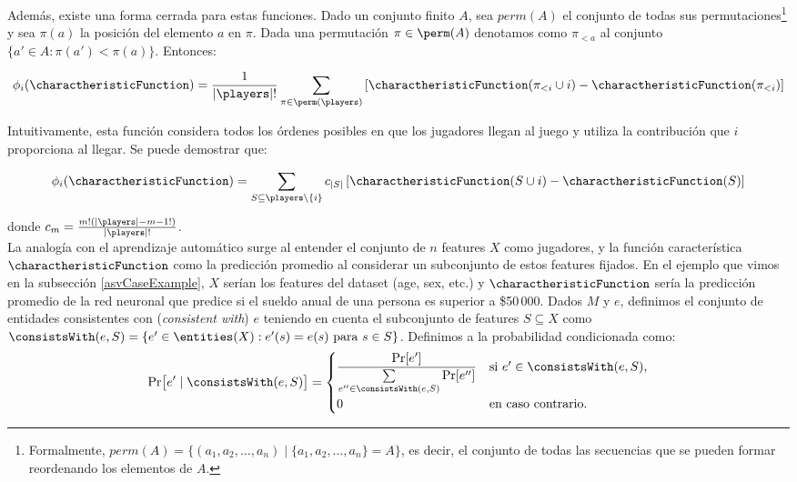 Además, existe una forma cerrada para estas funciones. Dado un conjunto finito $A$, sea $perm(A)$ el conjunto de todas sus permutaciones\footnote{Formalmente, $perm(A) = \{(a_1, a_2, \dots, a_n) \mid \{a_1, a_2, \dots, a_n\} = A\}$, es decir, el conjunto de todas las secuencias que se pueden formar reordenando los elementos de $A$.} y sea $\pi(a)$ la posición del elemento $a$ en $\pi$. Dada una permutación $\pi \in \perm(A)$ denotamos como $\pi_{<a}$ al conjunto $\{a' \in A : \pi(a') < \pi(a)\}$. Entonces:

\begin{align}\label{eq:shapley_values_by_perm}
	\phi_i(\charactheristicFunction) = \frac{1}{|\players|!} \sum_{\pi \in \perm(\players)} \left[\charactheristicFunction(\pi_{<i} \cup {i}) - \charactheristicFunction(\pi_{<i})\right]
\end{align}

Intuitivamente, esta función considera todos los órdenes posibles en que los jugadores llegan al juego y utiliza la contribución que $i$ proporciona al llegar. Se puede demostrar que:

\begin{align*}
	\phi_i(\charactheristicFunction) = \sum_{S \subseteq \players \setminus \{i\}} c_{|S|}\left[\charactheristicFunction(S \cup {i}) - \charactheristicFunction(S)\right]
\end{align*}

donde $c_m = \frac{m! (|\players|-m-1!)}{|\players|!}$.\\

La analogía con el aprendizaje automático surge al entender el conjunto de \(n\) features \(X\) como jugadores, y la función característica \(\charactheristicFunction\) como la predicción promedio al considerar un subconjunto de estos features fijados. En el ejemplo que vimos en la subsección \ref{asvCaseExample}, $X$ serían los features del dataset (age, sex, etc.) y $\charactheristicFunction$ sería la predicción promedio de la red neuronal que predice si el sueldo anual de una persona es superior a \$50\,000. Dados \(M\) y \(e\), definimos el conjunto de entidades consistentes con (\textit{consistent with}) \(e\) teniendo en cuenta el subconjunto de features \(S \subseteq X\) como \(\consistsWith(e, S) = \{e' \in \entities(X) : e'(s) = e(s) \text{ para } s \in S\}\). Definimos a la probabilidad condicionada como: %
\[
\Pr\bigl[e' \mid \consistsWith(e,S)\bigr] =
\begin{cases}
	\displaystyle \frac{\Pr[e']}{\sum\limits_{e'' \in \consistsWith(e,S)} \Pr[e'']} & \text{si } e' \in \consistsWith(e,S), \\
	0 & \text{en caso contrario}.
\end{cases}
\]

